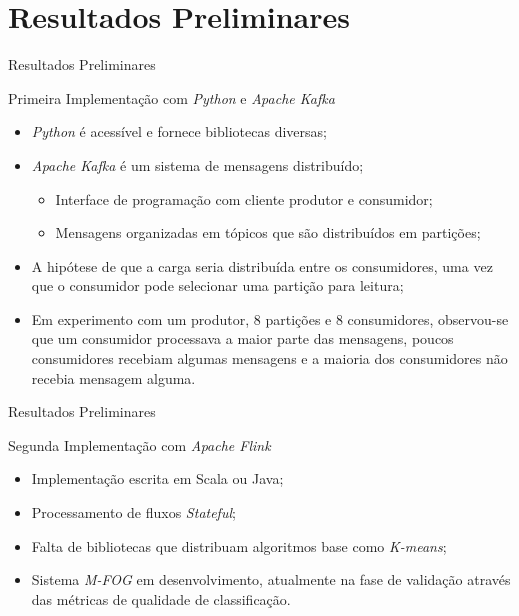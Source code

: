 \documentclass[aspectratio=43,10pt]{beamer}
\newcommand{\nota}[1]{\hspace*{-0.5cm}\textit{{\color[rgb]{1,0,0}Nota: #1}}}
\begin{document}
\section{Resultados Preliminares}
\begin{frame}[fragile]{Resultados Preliminares}

  \begin{alertblock}{Primeira Implementação com \emph{Python} e \emph{Apache Kafka}}
    \begin{itemize}[<+- | alert@+>]
      \item \emph{Python} é acessível e fornece bibliotecas diversas;
      \item \emph{Apache Kafka} é um sistema de mensagens distribuído;
      \begin{itemize}
        \item Interface de programação com cliente produtor e consumidor;
        \item Mensagens organizadas em tópicos que são distribuídos em partições;
      \end{itemize}
      \item A hipótese de que a carga seria distribuída entre os consumidores,
      uma vez que o consumidor pode selecionar uma partição para leitura;
      \item Em experimento com um produtor, 8 partições e 8 consumidores,
      observou-se que um consumidor processava a maior parte das mensagens,
      poucos consumidores recebiam algumas mensagens e a maioria dos consumidores
      não recebia mensagem alguma.
    \end{itemize}
  \end{alertblock}
\end{frame}

\begin{frame}[fragile]{Resultados Preliminares}
  \begin{alertblock}{Segunda Implementação com \emph{Apache Flink}}
    \begin{itemize}[<+- | alert@+>]
      \item Implementação escrita em Scala ou Java;
      \item Processamento de fluxos \emph{Stateful};
      \item Falta de bibliotecas que distribuam algoritmos base como \emph{K-means};
      \item Sistema \emph{M-FOG} em desenvolvimento, atualmente na fase de
      validação através das métricas de qualidade de classificação.
    \end{itemize}
  \end{alertblock}


\end{frame}
\end{document}
